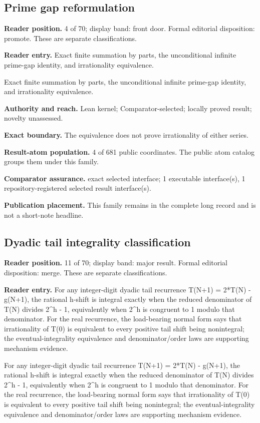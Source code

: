 \documentclass[11pt]{article}
\begin{document}
\subsection{Prime gap reformulation}
\textbf{Reader position.} 4 of 70; display band: front door.  Formal editorial disposition: promote.  These are separate classifications.

\textbf{Reader entry.} Exact finite summation by parts, the unconditional infinite prime-gap identity, and irrationality equivalence.

Exact finite summation by parts, the unconditional infinite prime-gap identity, and irrationality equivalence.

\textbf{Authority and reach.} Lean kernel; Comparator-selected; locally proved result; novelty unassessed.

\textbf{Exact boundary.} The equivalence does not prove irrationality of either series.

\textbf{Result-atom population.} 4 of 681 public coordinates. The public atom catalog groups them under this family.

\textbf{Comparator assurance.} exact selected interface; 1 executable interface(s), 1 repository-registered selected result interface(s).

\textbf{Publication placement.} This family remains in the complete long record and is not a short-note headline.

\subsection{Dyadic tail integrality classification}
\textbf{Reader position.} 11 of 70; display band: major result.  Formal editorial disposition: merge.  These are separate classifications.

\textbf{Reader entry.} For any integer-digit dyadic tail recurrence T(N+1) = 2*T(N) - g(N+1), the rational h-shift is integral exactly when the reduced denominator of T(N) divides 2\textasciicircum{}h - 1, equivalently when 2\textasciicircum{}h is congruent to 1 modulo that denominator. For the real recurrence, the load-bearing normal form says that irrationality of T(0) is equivalent to every positive tail shift being nonintegral; the eventual-integrality equivalence and denominator/order laws are supporting mechanism evidence.

For any integer-digit dyadic tail recurrence T(N+1) = 2*T(N) - g(N+1), the rational h-shift is integral exactly when the reduced denominator of T(N) divides 2\textasciicircum{}h - 1, equivalently when 2\textasciicircum{}h is congruent to 1 modulo that denominator. For the real recurrence, the load-bearing normal form says that irrationality of T(0) is equivalent to every positive tail shift being nonintegral; the eventual-integrality equivalence and denominator/order laws are supporting mechanism evidence.
\end{document}
